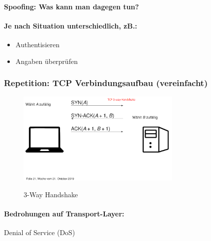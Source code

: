 \documentclass[10pt,a4paper]{article}
\begin{document}
\paragraph*{Spoofing: Was kann man dagegen tun?}
\paragraph*{Je nach Situation unterschiedlich, zB.:}
\begin{itemize}[noitemsep,topsep=0pt,leftmargin=*]
    \item {Authentisieren}
    \item {Angaben überprüfen}
\end{itemize}


\subsubsection*{Repetition: TCP Verbindungsaufbau (vereinfacht)}
\begin{figure}[H]
    \begin{center}
    \includegraphics[width=8cm]{images/Repetition_3_way_handshake.png}
    \caption{3-Way Handshake}
    \label{3-Way Handshake}
    \end{center}
\end{figure}


\paragraph*{Bedrohungen auf Transport-Layer:} Denial of Service (DoS)
\end{document}

